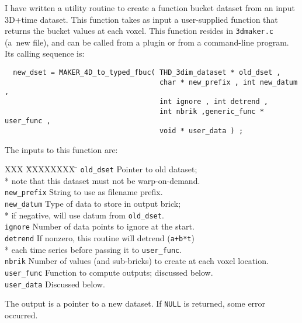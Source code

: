 I have written a utility routine to create a function bucket dataset from an input
3D+time dataset.  This function takes as input a user-supplied function
that returns the bucket values at each voxel.  This function
resides in {\tt 3dmaker.c} (a~new file), and can be called from a
plugin or from a command-line program.
Its calling sequence is:
\begin{verbatim}
  new_dset = MAKER_4D_to_typed_fbuc( THD_3dim_dataset * old_dset ,
                                     char * new_prefix , int new_datum ,
                                     int ignore , int detrend ,
                                     int nbrik ,generic_func * user_func ,
                                     void * user_data ) ;
\end{verbatim}
The inputs to this function are:
\begin{tabbing}
 XXX \= XXXXXXXX \= \kill
    \> {\tt old\_dset}   \> Pointer to old dataset; \\*
    \>                  \> \blob note that this dataset must not be warp-on-demand. \\[.5ex]
    \> {\tt new\_prefix} \> String to use as filename prefix. \\[.5ex]
    \> {\tt new\_datum}  \> Type of data to store in output brick; \\*
    \>                  \> \blob if negative, will use datum from {\tt old\_dset}. \\[.5ex]
    \> {\tt ignore}     \> Number of data points to ignore at the start. \\[.5ex]
    \> {\tt detrend}    \> If nonzero, this routine will detrend ({\tt a+b*t}) \\*
    \>                  \> \blob each time series before passing it to {\tt user\_func}. \\[.5ex]
    \> {\tt nbrik}      \> Number of values (and sub-bricks) to create at each voxel location. \\[.5ex]
    \> {\tt user\_func}  \> Function to compute outputs; discussed below. \\[.5ex]
    \> {\tt user\_data}  \> Discussed below.
\end{tabbing}
The output is a pointer to a new dataset.  If {\tt NULL} is returned,
some error occurred.

